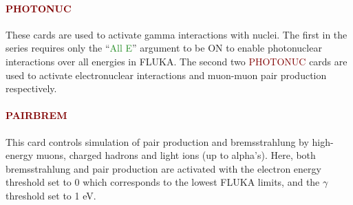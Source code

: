 \paragraph{\textcolor{Maroon}{PHOTONUC}}
These cards are used to activate gamma interactions with nuclei. The first in the series requires only the ``\textcolor{ForestGreen}{All E}'' argument to be ON to enable photonuclear interactions over all energies in FLUKA. The second two \textcolor{Maroon}{PHOTONUC} cards are used to activate electronuclear interactions and muon-muon pair production respectively.

\paragraph{\textcolor{Maroon}{PAIRBREM}}
This card controls simulation of pair production and bremsstrahlung by high-energy muons, charged hadrons and light ions (up to alpha's). Here, both bremsstrahlung and pair production are activated with the electron energy threshold set to 0 which corresponds to the lowest FLUKA limits, and the $\gamma$ threshold set to 1 eV.